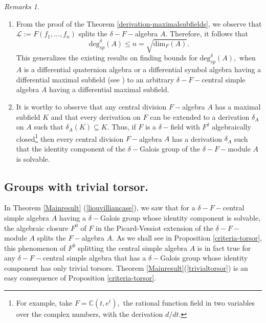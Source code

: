 \documentclass[preprint, 11pt]{amsart}
\theoremstyle{corollary}
\theoremstyle{remark}
\newtheorem*{remarks*}{Remarks}
\theoremstyle{proposition}
\numberwithin{equation}{subsection}
\begin{document}
\begin{remarks*}
	
\item	\begin{enumerate}
		\item  From the proof of the Theorem \ref{derivation-maximalsubfields}, we observe that $\mathcal L:=F(f_1,\dots, f_n)$ splits the $\delta-F-$algebra $A.$ Therefore, it follows that $$\mathrm{deg}^\delta_{sp}(A)\leq n=\sqrt{\mathrm{dim}_F(A)}.$$  This generalizes the existing results on finding bounds for $\mathrm{deg}^\delta_{sp}(A),$ when $A$ is a differential quaternion algebra or a differential symbol algebra  having a differential maximal subfield (see \cite{AKVRS, AKG}) to an arbitrary $\delta-F-$central simple algebra $A$ having a differential maximal subfield.
	
	 \item  It is worthy to observe that any central division $F-$algebra $A$ has a maximal subfield $K$ and that every derivation on $F$ can be extended to a derivation $\delta_A$ on $A$ such that $\delta_A(K)\subseteq K.$ Thus, if $F$ is a $\delta-$field with $F^{\delta}$ algebraically closed\footnote{For example, take $F=\mathbb C(t,e^t),$ the rational function field in two variables over the complex numbers, with the derivation $d/dt.$} then  every central division $F-$algebra $A$ has a derivation $\delta_A$ such that the identity component of the $\delta-$Galois group of the $\delta-F-$module $A$ is solvable.
\end{enumerate}	
\end{remarks*}




\subsection{Groups with trivial torsor.} \label{groupswithtrivialtorsor} In Theorem \ref{Mainresult} (\ref{liouvilliancase}), we saw that for a $\delta-F-$central simple algebra $A$ having a $\delta-$Galois group whose identity component is solvable, the algebraic closure $F^0$  of $F$ in the Picard-Vessiot extension of the $\delta-F-$module $A$ splits the $F-$algebra $A.$   As we shall see in Proposition \ref{criteria-torsor}, this phenomenon of  $F^0$ splitting the central simple algebra $A$  is in fact true for any  $\delta-F-$central simple algebra that has a $\delta-$Galois group  whose identity component has only  trivial torsors.  Theorem \ref{Mainresult}(\ref{trivialtorsor}) is an easy consequence of Proposition \ref{criteria-torsor}.
\end{document}
